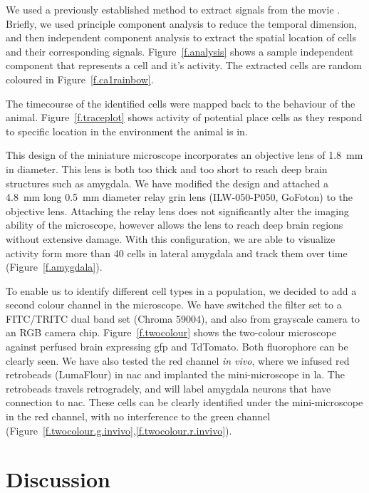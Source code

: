 We used a previously established method to extract  signals from the movie \citep{mukamel09}. Briefly, we used principle component analysis to reduce the temporal dimension, and then independent component analysis to extract the spatial location of cells and their corresponding  signals. Figure~\ref{f.analysis} shows a sample independent component that represents a cell and it's activity. The extracted cells are random coloured in Figure~\ref{f.ca1rainbow}.   

The timecourse of the identified cells were mapped back to the behaviour of the animal. Figure~\ref{f.traceplot} shows  activity of potential place cells as they respond to specific location in the environment the animal is in.

This design of the miniature microscope incorporates an objective lens of \SI{1.8}{\mm} in diameter. This lens is both too thick and too short to reach deep brain structures such as amygdala. We have modified the design and attached a \SI{4.8}{\mm} long \SI{0.5}{\mm} diameter relay \gls{grin} lens (ILW-050-P050, GoFoton) to the objective lens. Attaching the relay lens does not significantly alter the imaging ability of the microscope, however allows the lens to reach deep brain regions without extensive damage. With this configuration, we are able to visualize activity form more than 40 cells in lateral amygdala and track them over time (Figure~\ref{f.amygdala}).


To enable us to identify different cell types in a population, we decided to add a second colour channel in the microscope. We have switched the filter set to a FITC/TRITC dual band set (Chroma 59004), and also from grayscale camera to an RGB camera chip. Figure~\ref{f.twocolour} shows the two-colour microscope against perfused brain expressing \gls{gfp} and TdTomato. Both fluorophore can be clearly seen. We have also tested the red channel \textit{in vivo}, where we infused red retrobeads (LumaFlour) in \gls{nac} and implanted the mini-microscope in \gls{la}. The retrobeads travels retrogradely, and will label amygdala neurons that have connection to \gls{nac}. These cells can be clearly identified under the mini-microscope in the red channel, with no interference to the green channel (Figure~\ref{f.twocolour.g.invivo},\ref{f.twocolour.r.invivo}). 

\section{Discussion}
